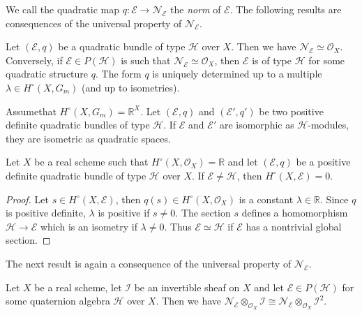 We call the quadratic map $q:\mathscr{E}\to \mathscr{N}_{\mathscr{E}}$
the {\em norm} of $\mathscr{E}$. The following results are
consequences of the universal property of $\mathscr{N}_{\mathscr{E}}$.

\begin{subcoro}\label{chap9-coro1.6}
Let $(\mathscr{E},q)$ be a quadratic bundle of type $\mathscr{H}$ over
$X$. Then we have
$\mathscr{N}_{\mathscr{E}}\simeq \mathscr{O}_{X}$. Conversely, if
$\mathscr{E}\in P(\mathscr{H})$ is such that
$\mathscr{N}_{\mathscr{E}}\simeq \mathscr{O}_{X}$, then $\mathscr{E}$
is of type $\mathscr{H}$ for some quadratic structure $q$. The form
$q$ is uniquely determined up to a multiple $\lambda\in
H^{\circ}(X,G_{m})$ (and up to isometries).
\end{subcoro}

\begin{subcoro}\label{chap9-coro1.7}
Assume\pageoriginale that $H^{\circ}(X,G_{m})=\mathbb{R}^{X}$. Let
$(\mathscr{E},q)$ and $(\mathscr{E}',q')$ be two positive definite
quadratic bundles of type $\mathscr{H}$. If $\mathscr{E}$ and
$\mathscr{E}'$ are isomorphic as $\mathscr{H}$-modules, they are
isometric as quadratic spaces.
\end{subcoro}

\begin{subprop}\label{chap9-prop1.8}
Let $X$ be a real scheme such that
$H^{\circ}(X,\mathscr{O}_{X})=\mathbb{R}$ and let $(\mathscr{E},q)$ be
a positive definite quadratic bundle of type $\mathscr{H}$ over
$X$. If $\mathscr{E}\neq \mathscr{H}$, then
$H^{\circ}(X,\mathscr{E})=0$. 
\end{subprop}

\begin{proof}
Let $s\in H^{\circ}(X,\mathscr{E})$, then $q(s)\in
H^{\circ}(X,\mathscr{O}_{X})$ is a constant
$\lambda\in \mathbb{R}$. Since $q$ is positive definite, $\lambda$ is
positive if $s\neq 0$. The section $s$ defines a homomorphism
$\mathscr{H}\to \mathscr{E}$ which is an isometry if $\lambda\neq
0$. Thus $\mathscr{E}\simeq \mathscr{H}$ if $\mathscr{E}$ has a
nontrivial global section.
\end{proof}

The next result is again a consequence of the universal property of
$\mathscr{N}_{\mathscr{E}}$. 

\begin{sublem}\label{chap9-lem1.9}
Let $X$ be a real scheme, let $\mathscr{I}$ be an invertible sheaf on
$X$ and let $\mathscr{E}\in P(\mathscr{H})$ for some quaternion
algebra $\mathscr{H}$ over $X$. Then we have
$\mathscr{N}_{\mathscr{E}}\otimes_{\mathscr{O}_{X}}\mathscr{I}\cong \mathscr{N}_{\mathscr{E}}\otimes_{\mathscr{O}_{X}}\mathscr{I}^{2}$. 
\end{sublem}

